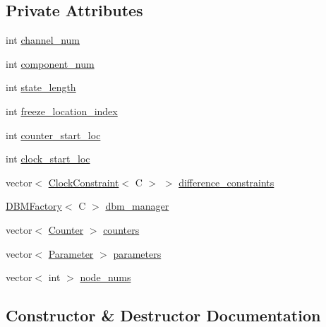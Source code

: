 \subsection*{Private Attributes}
\begin{DoxyCompactItemize}
\item 
int \mbox{\hyperlink{classgraphsat_1_1_state_manager_abf48c9171dfb81d38b5b45f052b75f5c}{channel\+\_\+num}}
\item 
int \mbox{\hyperlink{classgraphsat_1_1_state_manager_a20559a319430460a8201d204a630a6b1}{component\+\_\+num}}
\item 
int \mbox{\hyperlink{classgraphsat_1_1_state_manager_a75440e91940c7228bcc3e275105c8dab}{state\+\_\+length}}
\item 
int \mbox{\hyperlink{classgraphsat_1_1_state_manager_a7874bee08d472e01506856b31300e44c}{freeze\+\_\+location\+\_\+index}}
\item 
int \mbox{\hyperlink{classgraphsat_1_1_state_manager_ac2c1d0819eed43a92fe13ae28f519d77}{counter\+\_\+start\+\_\+loc}}
\item 
int \mbox{\hyperlink{classgraphsat_1_1_state_manager_a4929a01d210fbd2fe697f3714b8b9b25}{clock\+\_\+start\+\_\+loc}}
\item 
vector$<$ \mbox{\hyperlink{classgraphsat_1_1_clock_constraint}{Clock\+Constraint}}$<$ C $>$ $>$ \mbox{\hyperlink{classgraphsat_1_1_state_manager_a87a7f4aba15eea34c673d605e4f61582}{difference\+\_\+constraints}}
\item 
\mbox{\hyperlink{classgraphsat_1_1_d_b_m_factory}{D\+B\+M\+Factory}}$<$ C $>$ \mbox{\hyperlink{classgraphsat_1_1_state_manager_a0d038a5e508b0ac118f42c09e59c82bc}{dbm\+\_\+manager}}
\item 
vector$<$ \mbox{\hyperlink{classgraphsat_1_1_counter}{Counter}} $>$ \mbox{\hyperlink{classgraphsat_1_1_state_manager_a68162ffba7ca5f9de04787095cfd3e74}{counters}}
\item 
vector$<$ \mbox{\hyperlink{classgraphsat_1_1_parameter}{Parameter}} $>$ \mbox{\hyperlink{classgraphsat_1_1_state_manager_acfb344ab21f866555bd644fffa435ea8}{parameters}}
\item 
vector$<$ int $>$ \mbox{\hyperlink{classgraphsat_1_1_state_manager_a85731d5209f0ba6ce37f7f84d4997d96}{node\+\_\+nums}}
\end{DoxyCompactItemize}


\subsection{Constructor \& Destructor Documentation}
\mbox{\label{classgraphsat_1_1_state_manager_a0afffac67599f0522d5ba72f43fb1e7e}} 
